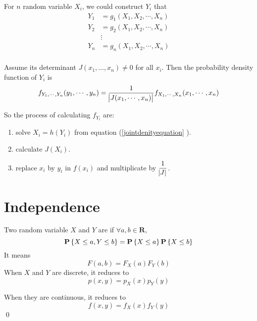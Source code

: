 For $n$ random variable $X_i$, we could construct $Y_i$ that
\begin{equation}\label{jointdenityequation}
    \begin{aligned}
        Y_1 &= g_1 (X_1, X_2, \cdots, X_n) \\
        Y_2 &= g_2 (X_1, X_2, \cdots, X_n) \\
        & \vdots \\
        Y_n &= g_n (X_1, X_2, \cdots, X_n) \\
    \end{aligned}
\end{equation}

Assume its  determinant $J(x_1, \dots, x_n) \neq 0$ for all $x_i$. Then the probability density function of $Y_i$ is 
\begin{equation}
    f_{Y_1, \cdots, Y_n}(y_1, \cdots, y_n) = \frac{1}{\abs{J(x_1, \cdots, x_n)}} f_{X_1, \cdots, X_n}(x_1, \cdots , x_n)
\end{equation}

So the process of calculating $f_{Y_i}$ are:
\begin{enumerate}
    \item solve $X_i = h(Y_i)$ from equation (\ref{jointdenityequation} ).
    \item calculate $J(X_i)$.
    \item replace $x_i$ by $y_i$ in $f(x_i)$ and multiplicate by $\displaystyle \frac{1}{\abs{J}}$.
\end{enumerate}


\section{Independence}

\begin{definition}
    Two random variable $X$ and $Y$ are  if $\forall a,b \in \mathbf{R}$,
    \begin{equation}
        \mathop{\bf P\/}\displaystyle \left\{ X \leq a , Y \leq b \right\} = \mathop{\bf P\/}\displaystyle \left\{ X \leq a \right\} \mathop{\bf P\/}\displaystyle \left\{ X \leq b \right\}
    \end{equation}
    It means
    \begin{equation}
        F(a,b) = F_X(a) F_Y(b)
    \end{equation}
    When $X$ and $Y$ are discrete, it reduces to
    \begin{equation}
        p(x,y) = p_X(x) p_Y(y)
    \end{equation}
    
    When they are continuous, it reduces to
    \begin{equation}
        f(x,y)=f_X(x) f_Y(y)
    \end{equation}
    \qed
\end{definition}

